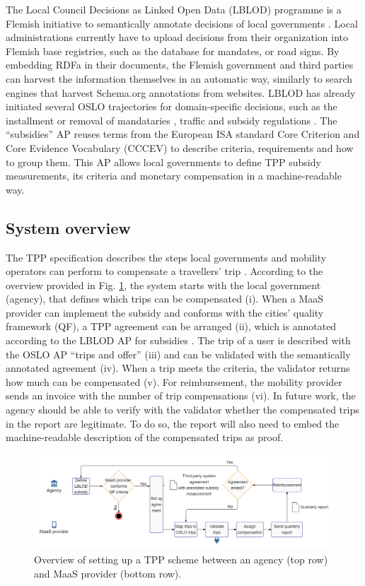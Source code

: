 \documentclass[runningheads]{llncs}
\begin{document}
The Local Council Decisions as Linked Open Data (LBLOD) programme is a Flemish initiative to semantically annotate decisions of local governments \cite{buyle_iswc_demo_2016}. Local administrations currently have to upload  decisions from their organization into Flemish base registries, such as the database for mandates, or road signs. By embedding RDFa in their documents, the Flemish government and third parties can harvest the information  themselves in an automatic way, similarly to search engines that harvest Schema.org annotations from websites. LBLOD has already initiated several OSLO trajectories for domain-specific decisions, such as the installment or removal of mandataries \cite{mandate}, traffic \cite{trafficmeasurement} and subsidy regulations \cite{subsidymeasurement}. The “subsidies” AP reuses terms from the European ISA standard Core Criterion and Core Evidence Vocabulary (CCCEV) \cite{cccev} to describe criteria, requirements and how to group them. This AP allows local governments to define  TPP subsidy measurements, its criteria and monetary compensation in a machine-readable way.

\subsection{System overview}

The TPP specification describes the steps local governments and mobility operators can perform to compensate a travellers' trip \cite{tpp}. According to the overview provided in Fig. \ref{fig:tppdiagram}, the system starts with the local government (agency), that defines which trips can be compensated (i). When a MaaS provider can implement the subsidy and conforms with the cities' quality framework (QF), a TPP agreement can be arranged (ii), which is annotated according to the LBLOD AP for subsidies \cite{subsidymeasurement}. The trip of a user is described with the OSLO AP “trips and offer” \cite{tripsandoffer} (iii) and can be validated with the semantically annotated agreement (iv). When a trip meets the criteria, the validator returns how much can be compensated (v). For reimbursement, the mobility provider sends an invoice with the number of trip compensations (vi). In future work, the agency should be able to verify with the validator whether the compensated trips in the report are legitimate. To do so, the report will also need to embed the machine-readable description of the compensated trips as proof.

\begin{figure}
\includegraphics[width=\textwidth]{tppdiagram.png}
\caption{Overview of setting up a TPP scheme between an agency (top row) and MaaS provider (bottom row).} 
\label{fig:tppdiagram}
\end{figure}
\end{document}
